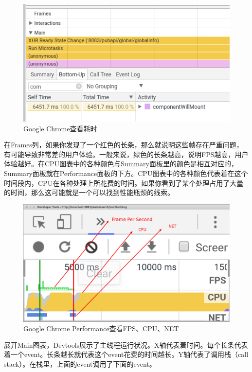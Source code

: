 \documentclass[12pt]{book}
\numberwithin{dummy}{section}
\theoremstyle{ocrenumbox}
\theoremstyle{blacknumex}
\theoremstyle{blacknumbox}
\theoremstyle{ocrenum}
\begin{document}
\begin{figure}[htbp]
	\centering
	\includegraphics[scale=0.5]{componentwillmountcheck.png}
	\caption{Google Chrome查看耗时}
	\label{fig:componentwillmountcheck}
\end{figure}

在Frames列，如果你发现了一个红色的长条，那么就说明这些帧存在严重问题，有可能导致非常差的用户体验。一般来说，绿色的长条越高，说明FPS越高，用户体验越好。在CPU图表中的各种颜色与Summary面板里的颜色是相互对应的，Summary面板就在Performance面板的下方。CPU图表中的各种颜色代表着在这个时间段内，CPU在各种处理上所花费的时间。如果你看到了某个处理占用了大量的时间，那么这可能就是一个可以找到性能瓶颈的线索。

\begin{figure}[htbp]
	\centering
	\includegraphics[scale=0.3]{chromeperformancegraph.png}
	\caption{Google Chrome Performance查看FPS、CPU、NET}
	\label{fig:chromeperformancegraph}
\end{figure}


展开Main图表，Devtools展示了主线程运行状况。X轴代表着时间。每个长条代表着一个event。长条越长就代表这个event花费的时间越长。Y轴代表了调用栈（call stack）。在栈里，上面的event调用了下面的event。
\end{document}

